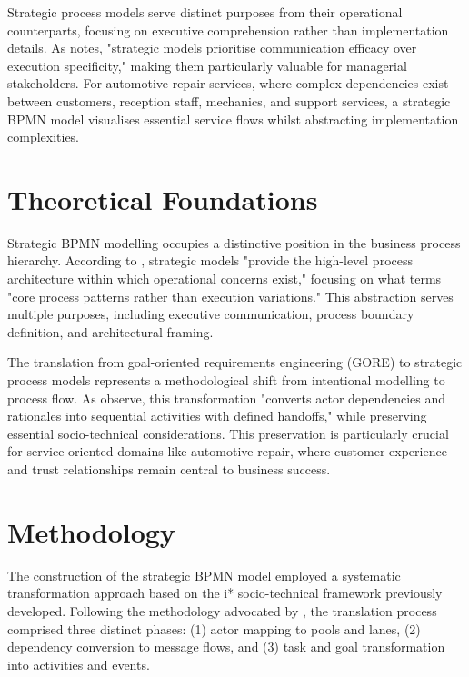 \documentclass[14pt,a4paper]{article}
\begin{document}
Strategic process models serve distinct purposes from their operational counterparts, focusing on executive comprehension rather than implementation details. As \textit{\parencite[p. 152]{Dijkman2011}} notes, "strategic models prioritise communication efficacy over execution specificity," making them particularly valuable for managerial stakeholders. For automotive repair services, where complex dependencies exist between customers, reception staff, mechanics, and support services, a strategic BPMN model visualises essential service flows whilst abstracting implementation complexities.

\section{Theoretical Foundations}

Strategic BPMN modelling occupies a distinctive position in the business process hierarchy. According to \textit{\parencite[p. 17]{Allweyer2016}}, strategic models "provide the high-level process architecture within which operational concerns exist," focusing on what \textit{\parencite[p. 89]{Dumas2018}} terms "core process patterns rather than execution variations." This abstraction serves multiple purposes, including executive communication, process boundary definition, and architectural framing.

The translation from goal-oriented requirements engineering (GORE) to strategic process models represents a methodological shift from intentional modelling to process flow. As \textit{\parencite[p. 342]{Dalpiaz2016}} observe, this transformation "converts actor dependencies and rationales into sequential activities with defined handoffs," while preserving essential socio-technical considerations. This preservation is particularly crucial for service-oriented domains like automotive repair, where customer experience and trust relationships remain central to business success.

\section{Methodology}

The construction of the strategic BPMN model employed a systematic transformation approach based on the i* socio-technical framework previously developed. Following the methodology advocated by \textit{\parencite[p. 208]{Cardoso2011}}, the translation process comprised three distinct phases: (1) actor mapping to pools and lanes, (2) dependency conversion to message flows, and (3) task and goal transformation into activities and events.
\end{document}
